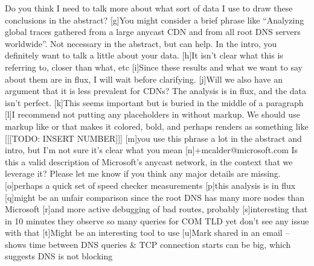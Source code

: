 \documentclass[sigconf,letterpaper,nonacm,10pt]{acmart}
\begin{document}
Do you think I need to talk more about what sort of data I use to draw
these conclusions in the abstract? {[}g{]}You might consider a brief
phrase like ``Analyzing global traces gathered from a large anycast CDN
and from all root DNS servers worldwide''. Not necessary in the
abstract, but can help. In the intro, you definitely want to talk a
little about your data. {[}h{]}It isn't clear what this is referring to,
closer than what, etc {[}i{]}Since these results and what we want to say
about them are in flux, I will wait before clarifying. {[}j{]}Will we
also have an argument that it is less prevalent for CDNs? The analysis
is in flux, and the data isn't perfect. {[}k{]}This seems important but
is buried in the middle of a paragraph {[}l{]}I recommend not putting
any placeholders in without markup. We should use markup like \tbd or
\todo that makes it colored, bold, and perhaps renders as something like
{[}{[}{[}TODO: INSERT NUMBER{]}{]}{]} {[}m{]}you use this phrase a lot
in the abstract and intro, but I'm not sure it's clear what you mean
{[}n{]}+mcalder@microsoft.com Is this a valid description of Microsoft's
anycast network, in the context that we leverage it? Please let me know
if you think any major details are missing. {[}o{]}perhaps a quick set
of speed checker measurements {[}p{]}this analysis is in flux
{[}q{]}might be an unfair comparison since the root DNS has many more
nodes than Microsoft {[}r{]}and more active debugging of bad routes,
probably {[}s{]}interesting that in 10 minutes they observe so many
queries for COM TLD yet don't see any issue with that {[}t{]}Might be an
interesting tool to use {[}u{]}Mark shared in an email -- shows time
between DNS queries \& TCP connection starts can be big, which suggests
DNS is not blocking


\end{document}
